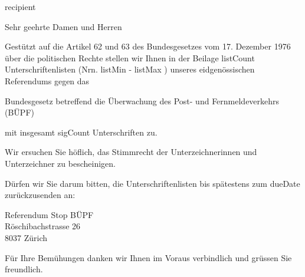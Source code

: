 \documentclass[a4paper,10pt,parskip=half]{scrlttr2}
\begin{document}
\begin{letter}{ {{ recipient }} }





\opening{Sehr geehrte Damen und Herren }

Gestützt auf die Artikel 62 und 63 des Bundesgesetzes vom 17. Dezember 1976 über die politischen Rechte stellen wir Ihnen in der Beilage {{ listCount }} Unterschriftenlisten (Nrn. {{ listMin }} - {{ listMax }}) unseres eidgenössischen Referendums gegen das

\leftskip=3mm
Bundesgesetz betreffend die Überwachung des Post- und Fernmeldeverkehrs (BÜPF)

\leftskip=0mm
mit insgesamt {{ sigCount }} Unterschriften zu.

Wir ersuchen Sie höflich, das Stimmrecht der Unterzeichnerinnen und Unterzeichner zu bescheinigen.

Dürfen wir Sie darum bitten, die Unterschriftenlisten bis spätestens zum {{ dueDate }} zurückzusenden an:

\leftskip=3mm
Referendum Stop BÜPF \\
Röschibachstrasse 26 \\
8037 Zürich

\leftskip=0mm
\closing{Für Ihre Bemühungen danken wir Ihnen im Voraus verbindlich und grüssen Sie freundlich.}

\end{letter}
\end{document}
